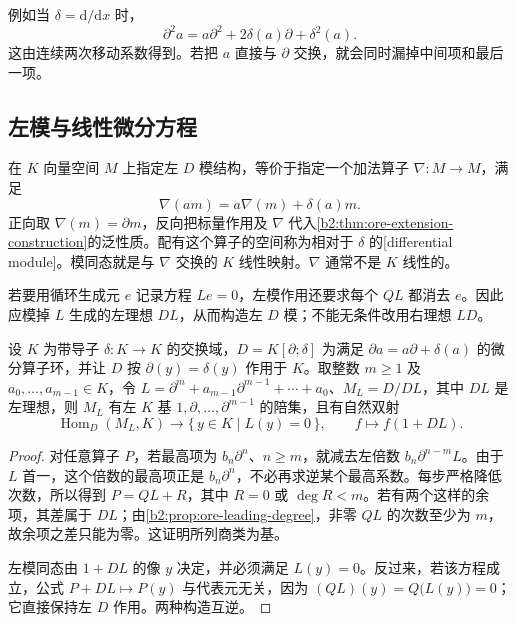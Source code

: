 \ProseParagraphBreak
例如当 \(\delta=\mathrm{d}/\mathrm{d}x\) 时，
\[
	\partial^2 a=a\partial^2+2\delta(a)\partial+\delta^2(a).
\]
这由连续两次移动系数得到。若把 \(a\) 直接与 \(\partial\) 交换，就会同时漏掉中间项和最后一项。

\subsection{左模与线性微分方程}
\label{b2:subsec:2005:04}

在 \(K\) 向量空间 \(M\) 上指定左 \(D\) 模结构，等价于指定一个加法算子 \(\nabla:M\to M\)，满足
\[
	\nabla(am)=a\nabla(m)+\delta(a)m.
\]
正向取 \(\nabla(m)=\partial m\)，反向把标量作用及 \(\nabla\) 代入\cref{b2:thm:ore-extension-construction}的泛性质。配有这个算子的空间称为相对于 \(\delta\) 的[differential module]。模同态就是与 \(\nabla\) 交换的 \(K\) 线性映射。\(\nabla\) 通常不是 \(K\) 线性的。

\ProseParagraphBreak
若要用循环生成元 \(e\) 记录方程 \(Le=0\)，左模作用还要求每个 \(QL\) 都消去 \(e\)。因此应模掉 \(L\) 生成的左理想 \(DL\)，从而构造左 \(D\) 模；不能无条件改用右理想 \(LD\)。

\begin{proposition}\label{b2:prop:differential-cyclic-module}
	设 \(K\) 为带导子 \(\delta:K\rightarrow K\) 的交换域，\(D=K[\partial;\delta]\) 为满足 \(\partial a=a\partial+\delta(a)\) 的微分算子环，并让 \(D\) 按 \(\partial(y)=\delta(y)\) 作用于 \(K\)。取整数 \(m\geq1\) 及 \(a_0,\ldots,a_{m-1}\in K\)，令 \(L=\partial^m+a_{m-1}\partial^{m-1}+\cdots+a_0\)、\(M_L=D/DL\)，其中 \(DL\) 是左理想，则 \(M_L\) 有左 \(K\) 基 \(1,\partial,\ldots,\partial^{m-1}\) 的陪集，且有自然双射
	\[
		\operatorname{Hom}_D(M_L,K)\longrightarrow\bigl\{\,y\in K\mid L(y)=0\,\bigr\}, \qquad f\longmapsto f(1+DL).
	\]
\end{proposition}
\begin{proof}
	对任意算子 \(P\)，若最高项为 \(b_n\partial^n\)、\(n\ge m\)，就减去左倍数 \(b_n\partial^{n-m}L\)。由于 \(L\) 首一，这个倍数的最高项正是 \(b_n\partial^n\)，不必再求逆某个最高系数。每步严格降低次数，所以得到 \(P=QL+R\)，其中 \(R=0\) 或 \(\deg R<m\)。若有两个这样的余项，其差属于 \(DL\)；由\cref{b2:prop:ore-leading-degree}，非零 \(QL\) 的次数至少为 \(m\)，故余项之差只能为零。这证明所列商类为基。

	左模同态由 \(1+DL\) 的像 \(y\) 决定，并必须满足 \(L(y)=0\)。反过来，若该方程成立，公式 \(P+DL\mapsto P(y)\) 与代表元无关，因为 \((QL)(y)=Q\bigl(L(y)\bigr)=0\)；它直接保持左 \(D\) 作用。两种构造互逆。
\end{proof}


